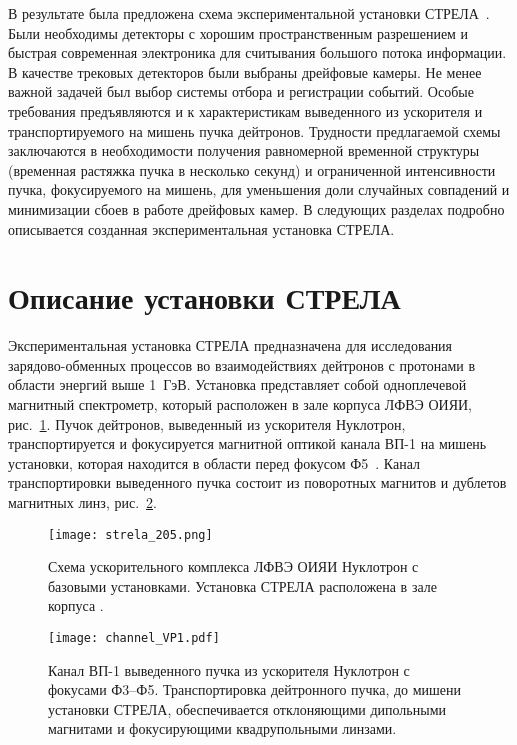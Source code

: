 В результате была предложена схема экспериментальной установки
СТРЕЛА~\cite{strela_web}. Были необходимы детекторы с хорошим пространственным
разрешением и быстрая современная электроника для считывания большого потока
информации. В качестве трековых детекторов были выбраны дрейфовые камеры. Не
менее важной задачей был выбор системы отбора и регистрации событий. Особые
требования предъявляются и к характеристикам выведенного из ускорителя и
транспортируемого на мишень пучка дейтронов. Трудности предлагаемой схемы
заключаются в необходимости получения равномерной временной структуры (временная
растяжка пучка в несколько секунд) и ограниченной интенсивности пучка,
фокусируемого на мишень, для уменьшения доли случайных совпадений и минимизации
сбоев в работе дрейфовых камер. В следующих разделах подробно описывается
созданная экспериментальная установка СТРЕЛА.

\section{Описание установки СТРЕЛА}
Экспериментальная установка СТРЕЛА предназначена для исследования
зарядово-обменных процессов во взаимодействиях дейтронов с протонами в области
энергий выше 1~ГэВ. Установка представляет собой одноплечевой магнитный
спектрометр, который расположен в зале корпуса  ЛФВЭ ОИЯИ,
рис.~\ref{fig:strela_205}. Пучок дейтронов, выведенный из ускорителя Нуклотрон,
транспортируется и фокусируется магнитной оптикой канала ВП-1 на мишень
установки, которая находится в области перед фокусом Ф5~\cite{issinsky94}.
Канал транспортировки выведенного пучка состоит из поворотных магнитов и
дублетов магнитных линз, рис.~\ref{fig:channel_VP1}.

\begin{figure}[h]
  \centering
  \texttt{[image: strela\_205.png]}
  \caption{Схема ускорительного комплекса ЛФВЭ ОИЯИ Нуклотрон с базовыми
    установками. Установка СТРЕЛА расположена в зале корпуса .}
  \label{fig:strela_205}
\end{figure}

\begin{figure}[h]
  \centering
  \texttt{[image: channel\_VP1.pdf]}
  \caption{Канал ВП-1 выведенного пучка из ускорителя Нуклотрон с фокусами
    Ф3--Ф5. Транспортировка дейтронного пучка, до мишени установки СТРЕЛА,
    обеспечивается отклоняющими дипольными магнитами и фокусирующими
    квадрупольными линзами.}
  \label{fig:channel_VP1}
\end{figure}

